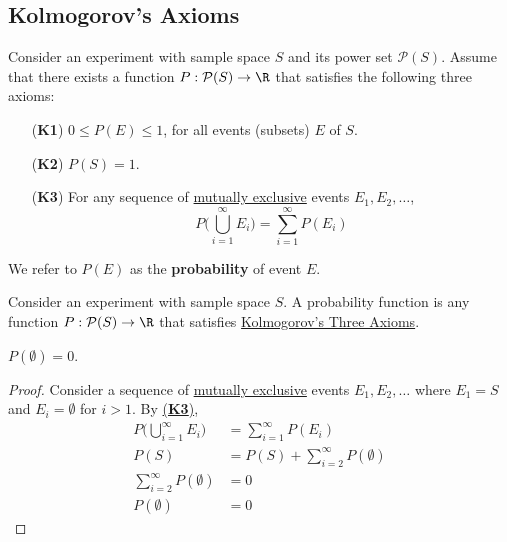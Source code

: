 \subsection{Kolmogorov's Axioms}\label{e4ebdc3}

\label{f41946e}

Consider an experiment with sample space $S$ and its power set $\mathcal P(S)$.
Assume that there exists a function $P:\mathcal P(S)\to\R$ that satisfies the
following three axioms:
\begin{enumerate}
  \item [(\textbf{K1})] $0\leq P(E)\leq1$, for all events (subsets) $E$ of $S$.
  \item [(\textbf{K2})] $P(S)=1$.
  \item [(\textbf{K3})] For any sequence of \href{a16826f}{mutually exclusive}
        events $E_1,E_2,\ldots$,
        $$
          P\biggl(\bigcup_{i=1}^\infty E_i\biggr)=\sum_{i=1}^\infty P(E_i)
        $$
\end{enumerate}

We refer to $P(E)$ as the \textbf{probability} of event $E$.

\label{fa898fb}

Consider an experiment with sample space $S$. A probability function is any
function $P:\mathcal P(S)\to\R$ that satisfies \href{f41946e}{Kolmogorov's
Three Axioms}.

\label{a0a9280}

$P(\emptyset)=0$.

\begin{proof}
  Consider a sequence of \href{a16826f}{mutually exclusive} events
  $E_1,E_2,\ldots$ where $E_1=S$ and $E_i=\emptyset$ for $i>1$. By
  \href{f41946e}{(\textbf{K3})},
  \begin{align*}
    P\biggl(\bigcup_{i=1}^\infty E_i\biggr) &=\sum_{i=1}^\infty P(E_i)            \\
    P(S)                                    &=P(S)+\sum_{i=2}^\infty P(\emptyset) \\[-0.8em]
    \sum_{i=2}^\infty P(\emptyset)          &=0                                   \\
    P(\emptyset)                            &=0
  \end{align*}
\end{proof}

\label{dfbba22}

